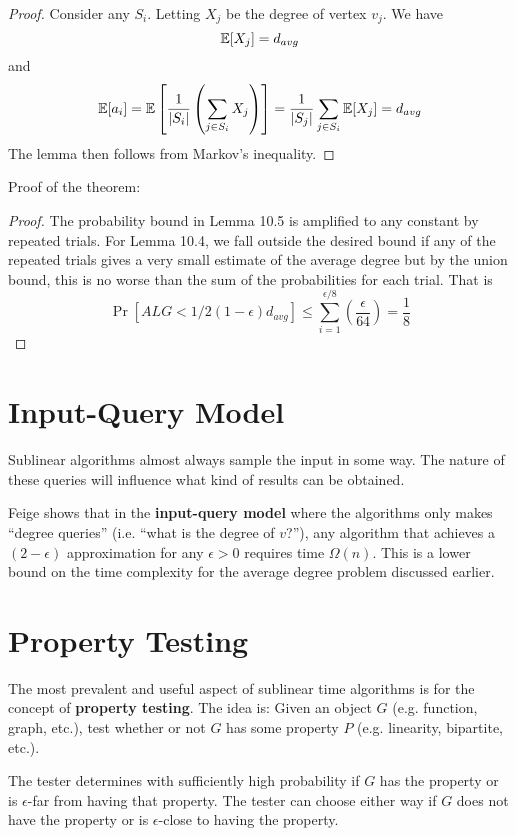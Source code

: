 \begin{proof}
    Consider any $S_i$. Letting $X_j$ be the degree of vertex $v_j$. We have
    $$
    \mathbb{E}[X_j] = d_{avg}
    $$ 
    and
    $$
    \mathbb{E}[a_i] = \mathbb{E}\left[ \frac{1}{|S_i|} \left( \sum_{j \in S_i} X_j \right)  \right] = \frac{1}{|S_j|} \sum_{j \in S_i} \mathbb{E}[X_j] = d_{avg}
    $$
    The lemma then follows from Markov's inequality.
\end{proof}

Proof of the theorem:

\begin{proof}
    The probability bound in Lemma 10.5 is amplified to any constant by repeated trials. For Lemma 10.4, we fall outside the desired bound if any of the repeated trials gives a very small estimate of the average degree but by the union bound, this is no worse than the sum of the probabilities for each trial. That is
    $$
    \Pr[ALG < 1/2 (1 - \epsilon)d_{avg} ] \leq \sum_{i=1}^{\epsilon/8} \left( \frac{\epsilon}{64} \right) = \frac{1}{8} 
    $$
\end{proof}

\section{Input-Query Model}

Sublinear algorithms almost always sample the input in some way. The nature of these queries will influence what kind of results can be obtained.

Feige shows that in the \textbf{input-query model} where the algorithms only makes ``degree queries'' (i.e. ``what is the degree of $v$?''), any algorithm that achieves a $(2 - \epsilon)$ approximation for any $\epsilon > 0$ requires time $\Omega(n)$. This is a lower bound on the time complexity for the average degree problem discussed earlier.

\section{Property Testing}

The most prevalent and useful aspect of sublinear time algorithms is for the concept of \textbf{property testing}. The idea is: Given an object $G$ (e.g. function, graph, etc.), test whether or not $G$ has some property $P$ (e.g. linearity, bipartite, etc.).

The tester determines with sufficiently high probability if $G$ has the property or is $\epsilon$-far from having that property. The tester can choose either way if $G$ does not have the property or is $\epsilon$-close to having the property.

